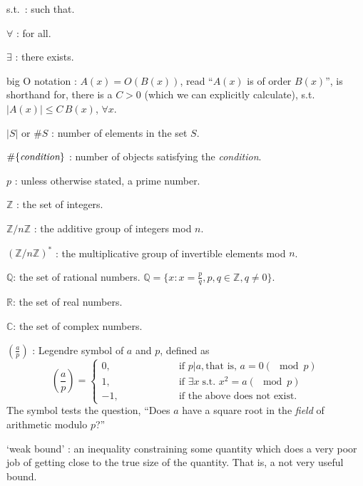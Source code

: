 \documentclass[12pt,letterpaper]{report}
\newcommand\st{\mbox{s.t.\ }}
\newcommand\be{\begin{equation}}
\newcommand\ee{\end{equation}}
\newcommand\ba{\begin{array}}
\newcommand\ea{\end{array}}
\newcommand{\R}{\ensuremath{\mathbb{R}}}
\newcommand{\C}{\ensuremath{\mathbb{C}}}
\newcommand{\Z}{\ensuremath{\mathbb{Z}}}
\newcommand{\Q}{\mathbb{Q}}
\newcommand\lag[2]{\ensuremath{\left(\frac{#1}{#2}\right)}}
\begin{document}
\item \st : such that.

\item $\forall$ : for all.

\item $\exists$ : there exists.

\item big O notation :
$A(x) = O(B(x))$, read ``$A(x)$ is of order $B(x)$'', is shorthand
for, there is a $C>0$ (which we can explicitly calculate), \st
$|A(x)| \le C\, B(x)$, $\forall x$.


\item $|S|$ or $\# S$ : number of elements in the set $S$.

\item $\#\{\mbox{\em condition}\}$ :
number of objects satisfying the {\em condition}.

\item $p$ : unless otherwise stated, a prime number.

\item $\Z$ : the set of integers.

\item $\Z / n\Z$ : the additive group of integers mod $n$.

\item $(\Z / n\Z)^{*}$ : the multiplicative group of invertible
elements mod $n$.

\item $\Q$: the set of rational numbers. $\Q = \{x: x =
\frac{p}{q}, p,q \in \Z, q \neq 0\}$.

\item $\R$: the set of real numbers.

\item $\C$: the set of complex numbers.

\item \lag{a}{p} : Legendre symbol of $a$ and $p$, defined as
\be \lag{a}{p} = \left\{ \ba{ll}
0, \hspace{1in} & \mbox{if } p|a, \mbox{that is, } a = 0 (\mod p) \\
1, & \mbox{if } \exists x \;\st x^2 = a (\mod p) \\
-1, & \mbox{if the above does not exist}. \ea\right. \ee The
symbol tests the question, ``Does $a$ have a square root in the
{\em field} of arithmetic modulo $p$?''

\item `weak bound' :  an inequality constraining some quantity which
does a very poor job of getting close to the true size of the
quantity. That is, a not very useful bound.
\end{document}
